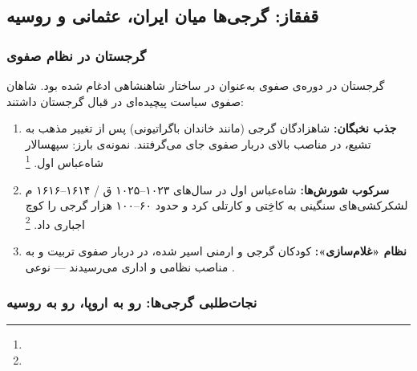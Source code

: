 \subsection{قفقاز: گرجی‌ها میان ایران، عثمانی و روسیه}
\label{subsec:ch06-georgia}

\subsubsection{گرجستان در نظام صفوی}

گرجستان در دوره‌ی صفوی به‌عنوان  در ساختار شاهنشاهی ادغام شده بود. شاهان صفوی سیاست پیچیده‌ای در قبال گرجستان داشتند:

\begin{enumerate}[nosep, label=\textbf{\arabic*.}]
  \item \textbf{جذب نخبگان:} شاهزادگان گرجی (مانند خاندان باگراتیونی) پس از تغییر مذهب به تشیع، در مناصب بالای دربار صفوی جای می‌گرفتند. نمونه‌ی بارز:  سپهسالار شاه‌عباس اول.%
  \footnote{}
  \item \textbf{سرکوب شورش‌ها:} شاه‌عباس اول در سال‌های ۱۰۲۳–۱۰۲۵ ق / ۱۶۱۴–۱۶۱۶ م لشکرکشی‌های سنگینی به کاخِتی و کارتلی کرد و حدود ۶۰–۱۰۰ هزار گرجی را کوچ اجباری داد.%
  \footnote{}
  \item \textbf{نظام «غلام‌سازی»:} کودکان گرجی و ارمنی اسیر شده، در دربار صفوی تربیت و به مناصب نظامی و اداری می‌رسیدند — نوعی .
\end{enumerate}

\subsubsection{نجات‌طلبی گرجی‌ها: رو به اروپا، رو به روسیه}


